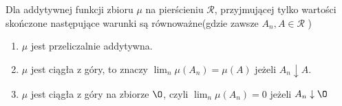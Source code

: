\begin{theorem}
	Dla addytywnej funkcji zbioru $\mu $ na pierścieniu $\mathcal{R}$, przyjmującej tylko wartości skończone następujące warunki są równoważne(gdzie zawsze $A_{n}, A \in \mathcal{R}$ )
	\begin{enumerate}[label=\alph*)]
		\item $\mu $ jest przeliczalnie addytywna.
		\item $\mu $ jest ciągła z góry, to znaczy $\lim_{n}\mu\left( A_{n} \right) = \mu\left( A \right)$ jeżeli $A_{n}\downarrow A$.
		\item $\mu $ jest ciągła z góry na zbiorze $\O$, czyli $\lim_{n}\mu\left( A_{n} \right) = 0 $ jeżeli $A_{n}\downarrow \O$
	\end{enumerate}
\end{theorem} 

